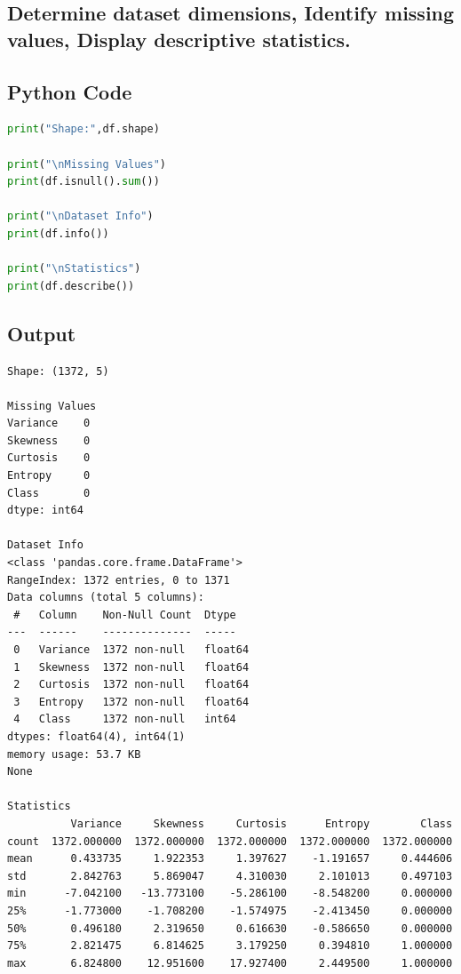 \documentclass[11pt]{article}
\begin{document}
\begin{itemize}
\section{Determine dataset dimensions,
Identify missing values,
Display descriptive statistics.}

\subsection{Python Code}

\begin{lstlisting}[language=Python]
print("Shape:",df.shape)

print("\nMissing Values")
print(df.isnull().sum())

print("\nDataset Info")
print(df.info())

print("\nStatistics")
print(df.describe())
\end{lstlisting}

\subsection{Output}

\begin{verbatim}
Shape: (1372, 5)

Missing Values
Variance    0
Skewness    0
Curtosis    0
Entropy     0
Class       0
dtype: int64

Dataset Info
<class 'pandas.core.frame.DataFrame'>
RangeIndex: 1372 entries, 0 to 1371
Data columns (total 5 columns):
 #   Column    Non-Null Count  Dtype  
---  ------    --------------  -----  
 0   Variance  1372 non-null   float64
 1   Skewness  1372 non-null   float64
 2   Curtosis  1372 non-null   float64
 3   Entropy   1372 non-null   float64
 4   Class     1372 non-null   int64  
dtypes: float64(4), int64(1)
memory usage: 53.7 KB
None

Statistics
          Variance     Skewness     Curtosis      Entropy        Class
count  1372.000000  1372.000000  1372.000000  1372.000000  1372.000000
mean      0.433735     1.922353     1.397627    -1.191657     0.444606
std       2.842763     5.869047     4.310030     2.101013     0.497103
min      -7.042100   -13.773100    -5.286100    -8.548200     0.000000
25%      -1.773000    -1.708200    -1.574975    -2.413450     0.000000
50%       0.496180     2.319650     0.616630    -0.586650     0.000000
75%       2.821475     6.814625     3.179250     0.394810     1.000000
max       6.824800    12.951600    17.927400     2.449500     1.000000

\end{verbatim}
\end{itemize}
\end{document}
